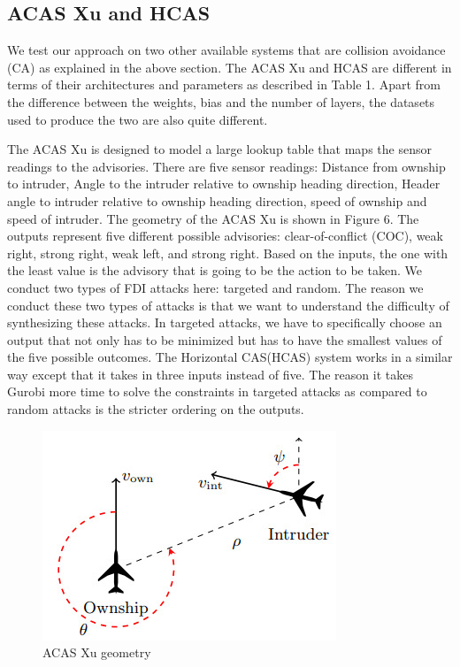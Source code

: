 \subsection{ACAS Xu and HCAS}
We test our approach on two other available systems that are collision avoidance (CA) as explained in the above section. The ACAS Xu and HCAS are different in terms of their architectures and parameters as described in Table 1. Apart from the difference between the weights, bias and the number of layers, the datasets used to produce the two are also quite different.  

The ACAS Xu is designed to model a large lookup table that maps the sensor readings to the advisories. There are five sensor readings:  Distance from ownship to intruder, Angle to the intruder relative to ownship heading direction, Header angle to intruder relative to ownship heading direction, speed of ownship and speed of intruder. The geometry of the ACAS Xu is shown in Figure 6. The outputs represent five different possible advisories: clear-of-conflict (COC), weak right, strong right, weak left, and strong right. Based on the inputs, the one with the least value is the advisory that is going to be the action to be taken.  We conduct two types of FDI attacks here: targeted and random. The reason we conduct these two types of attacks is that we want to understand the difficulty of synthesizing these attacks. In targeted attacks, we have to specifically choose an output that not only has to be minimized but has to have the smallest values of the five possible outcomes. The Horizontal CAS(HCAS) system works in a similar way except that it takes in three inputs instead of five. %
The reason it takes Gurobi more time to solve the constraints in targeted attacks as compared to random attacks is the stricter ordering on the outputs.

\begin{figure}
	\centering
	\includegraphics[width=0.7\linewidth]{Images/ACASXugeometry}
	\caption[ACAS Xu]{ACAS Xu geometry}
	\label{fig:acasxugeometry}
\end{figure}

